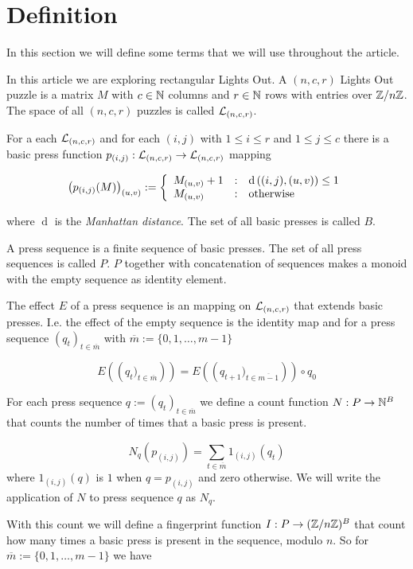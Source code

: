 \section{Definition}
In this section we will define some terms that we will use throughout the article.

In this article we are exploring rectangular Lights Out. A $(n, c, r)$ Lights Out puzzle
is a matrix $M$ with $c\in\mathbb{N}$ columns and $r\in\mathbb{N}$ rows with entries over $\mathbb{Z}/n\mathbb{Z}$. The space
of all $(n, c, r)$ puzzles is called $\mathcal{L}_{(n,c,r)}$.

For a each $\mathcal{L}_{(n,c,r)}$ and for each $(i, j)$ with $1\leq i \leq r$ and $1\leq j \leq c$
there is a basic press function $p_{(i,j)}: \mathcal{L}_{(n,c,r)} \rightarrow \mathcal{L}_{(n,c,r)}$ mapping

\[
    \left(p_{(i,j)}(M)\right)_{(u,v)} :=
    \left\{
    \begin{array}{l@{\quad:\quad}l}
        M_{(u,v)} + 1 & \operatorname{d}\left((i,j), (u,v)\right) \leq 1 \\
        M_{(u,v)}     & \text{otherwise}
    \end{array}
    \right.
\]

where $\operatorname{d}$ is the \emph{Manhattan distance}. The set of all basic presses is called $B$.

A press sequence is a finite sequence of basic presses. The set of all press sequences is called $P$.
$P$ together with concatenation of sequences makes a monoid with the empty sequence as identity element.

The effect $E$ of a press sequence is an mapping on $\mathcal{L}_{(n,c,r)}$ that extends basic presses.
I.e. the effect of the empty sequence is the identity map and for a press sequence $\left(q_{t}\right)_{t\in\overline{m}}$
with $\overline{m}:=\{0, 1, \ldots, m-1\}$

\[
    E\left(\left(q_{t})_{t\in\overline{m}}\right)\right)
    =
    E\left(\left(q_{t+1})_{t\in\overline{m-1}}\right)\right) \circ q_{0}
\]

For each press sequence $q:=\left(q_{t}\right)_{t\in\overline{m}}$ we define a count function $N: P \rightarrow \mathbb{N}^B$ that counts the number of times that a basic press is present.

\[
    N_{q}(p_{(i,j)}) = \sum_{t\in\overline{m}} 1_{(i,j)}(q_{t})
\]
where $1_{(i,j)}(q)$ is $1$ when $q=p_{(i,j)}$ and zero otherwise. We will write the application of $N$ to press sequence $q$ as $N_{q}$.

With this count we will define a fingerprint function $I: P \rightarrow (\mathbb{Z}/n\mathbb{Z})^{B}$ that count how many times a basic press
is present in the sequence, modulo $n$. So for $\overline{m}:=\{0, 1, \ldots, m-1\}$ we have

